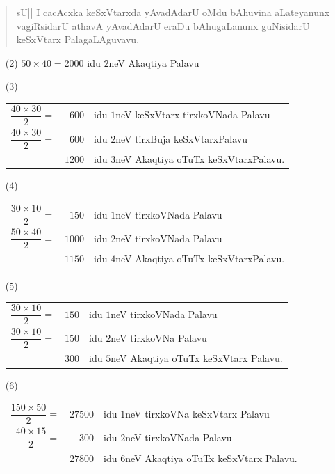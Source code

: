 \begin{verse}
sU|| I cacAcxka keSxVtarxda yAvadAdarU oMdu bAhuvina aLateyanunx
vagiRsidarU athavA yAvadAdarU eraDu bAhugaLanunx guNisidarU keSxVtarx
PalagaLAguvavu. 
\end{verse}

\begin{itemize}
\item[\rm(2)] $50\times 40=2000$ idu $2$neV Akaqtiya Palavu

\item[\rm(3)]
\begin{tabular}[t]{rrl}
$\dfrac{40\times 30}{2}=$ & $600$ & idu $1$neV keSxVtarx tirxkoVNada
Palavu\\[8pt]
$\dfrac{40\times 30}{2}=$ & $600$ & idu $2$neV tirxBuja
keSxVtarxPalavu\\
\cline{2-2}
 & $1200$ & idu $3$neV Akaqtiya oTuTx keSxVtarxPalavu.
\end{tabular}

\item[\rm(4)]
\begin{tabular}[t]{rrl}
$\dfrac{30\times 10}{2}=$ & $150$ & idu $1$neV tirxkoVNada Palavu\\[8pt]
$\dfrac{50\times 40}{2}=$ & $1000$ & idu $2$neV tirxkoVNada Palavu\\
\cline{2-2}
 & $1150$ & idu $4$neV Akaqtiya oTuTx keSxVtarxPalavu.
\end{tabular}

\item[\rm(5)]
\begin{tabular}[t]{rrl}
$\dfrac{30\times 10}{2}=$ & $150$ & idu $1$neV tirxkoVNada
Palavu\\[8pt]
$\dfrac{30\times 10}{2}=$ & $150$ & idu $2$neV tirxkoVNa Palavu\\
\cline{2-2}
 & $300$ & idu $5$neV Akaqtiya oTuTx keSxVtarx Palavu.
\end{tabular}

\item[\rm(6)]
\begin{tabular}[t]{rrl}
$\dfrac{150\times 50}{2}=$ & $27500$ & idu $1$neV tirxkoVNa keSxVtarx
Palavu\\[8pt]
$\dfrac{40\times 15}{2}=$ & $300$ & idu $2$neV tirxkoVNada Palavu\\
\cline{2-2}
 & $27800$ & idu $6$neV Akaqtiya oTuTx keSxVtarx Palavu.
\end{tabular}
\end{itemize}

\newpage

